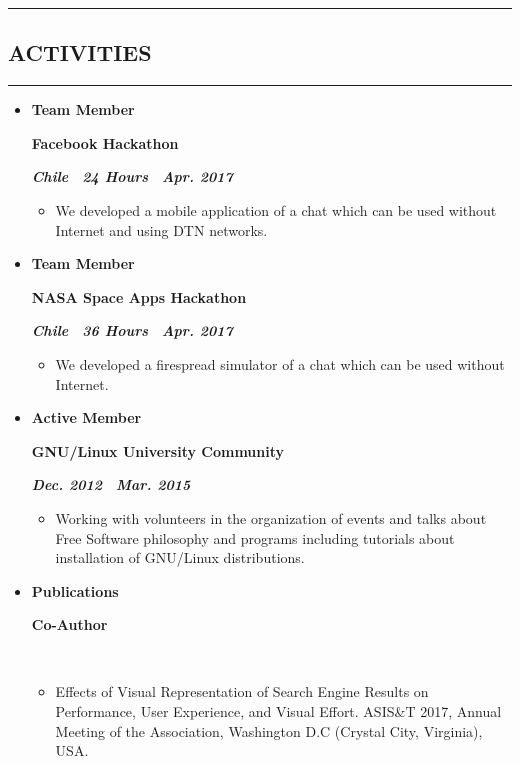 \documentclass[10pt,letterpaper]{article}
\newcommand{\textbox}[1]{
  \parbox{.333\textwidth}{#1}
}
\newcommand{\sectionTitle}[1]{
  \hrule
  \vspace{-1.0em} 
  \subsection*{\uppercase{\textbf{#1}} }
  \vspace{-0.3em}
    \hrule
    \vspace{0.3em}  
}
\newcommand{\titleExperienceWithoutLocation}[4]{
  \vspace{1.0em}
  \item[]
  {
    \textbox{\textbf{#1}\hfill}\textbox{\hfil \textbf{#2}\hfil}\hfill \textbf{\emph{#3 \textendash \ #4}}
  }
}
\begin{document}
  \vspace{0.30em} 
  \sectionTitle{Activities}
  \vspace{-0.8em}
  \begin{itemize}
    \parskip=-0.6em 

  
    \titleExperienceWithoutLocation{Team Member}{Facebook Hackathon}{Chile \textendash \ 24 Hours}{Apr. 2017}
      \begin{itemize}[label=\textbullet]
        \itemsep0em
        \item We developed a mobile application of a chat which can be used without Internet and using DTN networks.
      \end{itemize}
  
    \vspace{-0.6em} 
    \titleExperienceWithoutLocation{Team Member}{NASA Space Apps Hackathon}{Chile \textendash \ 36 Hours}{Apr. 2017}
      \begin{itemize}[label=\textbullet]
        \itemsep0em
        \item We developed a firespread simulator of a chat which can be used without Internet.
      \end{itemize}

    \vspace{-0.6em}   
    \titleExperienceWithoutLocation{Active Member}{GNU/Linux University Community}{Dec. 2012}{Mar. 2015}
\begin{itemize}[label=\textbullet]
  \itemsep0em
  \item Working with volunteers in the organization of events and talks about Free Software philosophy and programs including tutorials about installation of GNU/Linux distributions.
\end{itemize}

    \vspace{-0.6em} 
    \titleExperienceWithoutLocation{Publications}{Co-Author}{}{}
      \begin{itemize}[label=\textbullet]
        \itemsep0em
        \item Effects of Visual Representation of Search Engine Results on Performance, User Experience, and Visual Effort. ASIS\&T 2017,  Annual Meeting of the Association, Washington D.C (Crystal City, Virginia), USA.
      \end{itemize}
    \end{itemize} 
  \vspace{0.30em} 
  
\end{document}
